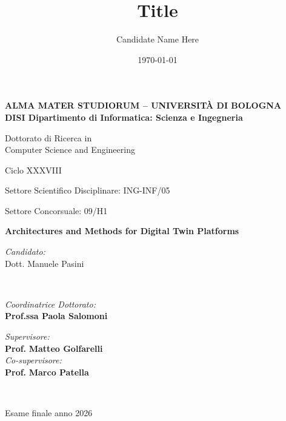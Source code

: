 \title{Title}
\author{Candidate Name Here}
\date{\today}

\begin{titlepage}
	\begin{center}

		\large
		\textbf{ALMA MATER STUDIORUM -- UNIVERSITÀ DI BOLOGNA \\ DISI Dipartimento di Informatica: Scienza e Ingegneria}
		\\
		\noindent\hrulefill
		\vspace{0.4cm}

		\Large
		Dottorato di Ricerca in \\
		Computer Science and Engineering

		\vspace{0.4cm}

		Ciclo XXXVIII

		\vspace{0.4cm}

		Settore Scientifico Disciplinare: ING-INF/05

		Settore Concorsuale: 09/H1

		\Huge
		\vspace{3cm}
		\textbf{
			Architectures and Methods for Digital Twin Platforms
		}

		{\Large{
		\vspace{3cm}

		\textit{Candidato:\\}
		\centering
		Dott. Manuele Pasini}
		\\}
		\large
		\vspace{2.5cm}
		\begin{minipage}[t]{0.64\textwidth}
			\begin{flushleft}
				\textit{Coordinatrice Dottorato:}
				\\
				\textbf{Prof.ssa Paola Salomoni}
			\end{flushleft}
		\end{minipage}
		\begin{minipage}[t]{0.34\textwidth}
			\begin{flushright}
				\textit{Supervisore:}
				\\
				\textbf{Prof.} \textbf{Matteo Golfarelli}
				\\
				\vspace{0.4cm}
				\textit{Co-supervisore:}
				\\
				\textbf{Prof.} \textbf{Marco Patella}
			\end{flushright}

		\end{minipage}\\

		\vfill
		\noindent\hrulefill
		\vspace{0.3cm}
		\Large

		Esame finale anno 2026
	\end{center}
\end{titlepage}
\restoregeometry